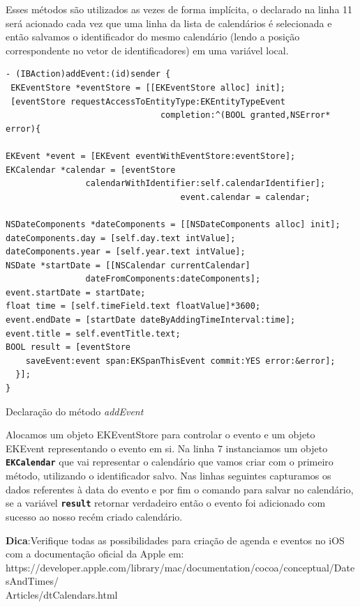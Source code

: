 \documentclass[a4paper,12pt,brazil,doubleside]{book}
\begin{document}
\begin{singlespace}
Esses métodos são utilizados as vezes de forma implícita, o declarado na linha 11 será acionado cada vez que uma linha da lista de calendários é selecionada e então salvamos o identificador do mesmo calendário (lendo a posição correspondente no vetor de identificadores) em uma variável local.

\begin{listing}[H]
\begin{verbatim}
- (IBAction)addEvent:(id)sender {
 EKEventStore *eventStore = [[EKEventStore alloc] init];
 [eventStore requestAccessToEntityType:EKEntityTypeEvent
                               completion:^(BOOL granted,NSError* error){

EKEvent *event = [EKEvent eventWithEventStore:eventStore];
EKCalendar *calendar = [eventStore 
				calendarWithIdentifier:self.calendarIdentifier];
                                   event.calendar = calendar;

NSDateComponents *dateComponents = [[NSDateComponents alloc] init];
dateComponents.day = [self.day.text intValue];
dateComponents.year = [self.year.text intValue];
NSDate *startDate = [[NSCalendar currentCalendar] 
				dateFromComponents:dateComponents];
event.startDate = startDate;
float time = [self.timeField.text floatValue]*3600;
event.endDate = [startDate dateByAddingTimeInterval:time];
event.title = self.eventTitle.text;
BOOL result = [eventStore 
	saveEvent:event span:EKSpanThisEvent commit:YES error:&error];
  }];
}
\end{verbatim}
\caption{Declaração do método \emph{addEvent}}
\end{listing}

Alocamos um objeto EKEventStore para controlar o evento e um objeto EKEvent representando o evento em si. Na linha 7 instanciamos um objeto  \texttt{\textbf{EKCalendar}} que vai representar o calendário que vamos criar com o primeiro método, utilizando o identificador salvo.
Nas linhas seguintes capturamos os dados referentes à data do evento e por fim o comando para salvar no calendário, se a variável \texttt{\textbf{result}} retornar verdadeiro então o evento foi adicionado com sucesso ao nosso recém criado calendário.

\begin{framed}

\textbf{Dica}:Verifique todas as possibilidades para criação de agenda e eventos no iOS com a documentação oficial da Apple em:\\ https://developer.apple.com/library/mac/documentation/cocoa/conceptual/DatesAndTimes/\\Articles/dtCalendars.html
\end{framed}


\end{singlespace}
\end{document}
